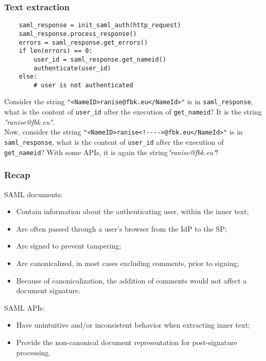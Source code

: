\documentclass[a4paper, 10pt, titlepage]{article}
\begin{document}
\subsubsection*{Text extraction}
\begin{lstlisting}
	saml_response = init_saml_auth(http_request)
	saml_response.process_response()
	errors = saml_response.get_errors()
	if len(errors) == 0:
		user_id = saml_response.get_nameid()
		authenticate(user_id)
	else:
		# user is not authenticated
\end{lstlisting}
Consider the string \lstinline|"<NameID>ranise@fbk.eu</NameId>"| is in \lstinline|saml_response|, what is the content of \lstinline|user_id| after the execution of \lstinline|get_nameid|? It is the string \textit{"ranise@fbk.eu"}. \medskip\\
Now, consider the string \lstinline|"<NameID>ranise<!---->@fbk.eu</NameId>"| is in \lstinline|saml_response|, what is the content of \lstinline|user_id| after the execution of \lstinline|get_nameid|? With some APIs, it is again the string\textit{"ranise@fbk.eu"}! \medskip

\subsubsection{Recap}
SAML documents:
\begin{itemize}
\item Contain information about the authenticating user, within the inner text;
\item Are often passed through a user’s browser from the IdP to the SP;
\item Are signed to prevent tampering;
\item Are canonicalized, in most cases excluding comments, prior to signing;
\item Because of canonicalization, the addition of comments would not affect a document signature.
\end{itemize}
SAML APIs:
\begin{itemize}
\item Have unintuitive and/or inconsistent behavior when extracting inner text;
\item Provide the non-canonical document representation for post-signature processing.
\end{itemize}
\end{document}
